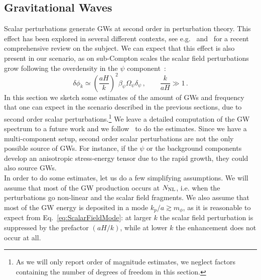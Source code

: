 \documentclass[a4paper, amsfonts, amssymb, amsmath, reprint, showkeys, nofootinbib, twoside, superscriptaddress]{revtex4-1}
\begin{document}
\subsection{Gravitational Waves}
\label{sec:GWs}

Scalar perturbations generate GWs at second order in perturbation theory. This effect has been explored in several different contexts, see e.g.~\cite{Baumann:2007zm, Assadullahi:2009nf, Espinosa:2018eve, Kohri:2018awv, Inomata:2020yqv, Inomata:2020tkl, Domenech:2020ssp, Domenech:2021wkk} and~\cite{Domenech:2021ztg} for a recent comprehensive review on the subject. We can expect that this effect is also present in our scenario, as on sub-Compton scales the scalar field perturbations grow following the overdensity in the $\psi$ component~\cite{Amendola:2003wa}:
\begin{equation}
\label{eq:ScalarFieldMode}
\delta\phi_k \simeq \left(\frac{a H}{k}\right)^2 \beta_\psi \Omega_\psi \delta_\psi \,, \qquad \frac{k}{aH} \gg 1 \,.
\end{equation}
In this section we sketch some estimates of the amount of GWs and frequency that one can expect in the scenario described in the previous sections, due to second order scalar perturbations.\footnote{As we will only report order of magnitude estimates, we neglect factors containing the number of degrees of freedom in this section.} We leave a detailed computation of the GW spectrum to a future work and we follow~\cite{Giblin:2014gra, Chatrchyan:2020pzh} to do the estimates. Since we have a multi-component setup, second order scalar perturbations are not the only possible source of GWs. For instance, if the $\psi$ or the background components develop an anisotropic stress-energy tensor due to the rapid growth, they could also source GWs.\\

In order to do some estimates, let us do a few simplifying assumptions. We will assume that most of the GW production occurs at $N_{\rm NL}$, i.e. when the perturbations go non-linear and the scalar field fragments. We also assume that most of the GW energy is deposited in a mode $k_p/a \gtrsim m_\phi$, as it is reasonable to expect from Eq.~\eqref{eq:ScalarFieldMode}: at larger $k$ the scalar field perturbation is suppressed by the prefactor $(aH/k)$, while at lower $k$ the enhancement does not occur at all.\\
\end{document}
